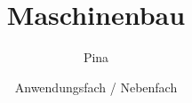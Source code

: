 \documentclass[11pt]{beamer}
\title[Anwendungsfach / Nebenfach: Maschinenbau] %
{Maschinenbau}
\author {Pina}
\date[WiSe2021] %
{Anwendungsfach / Nebenfach}
\begin{document}
\begin{frame}
	\titlepage
\end{frame}
\end{document}

